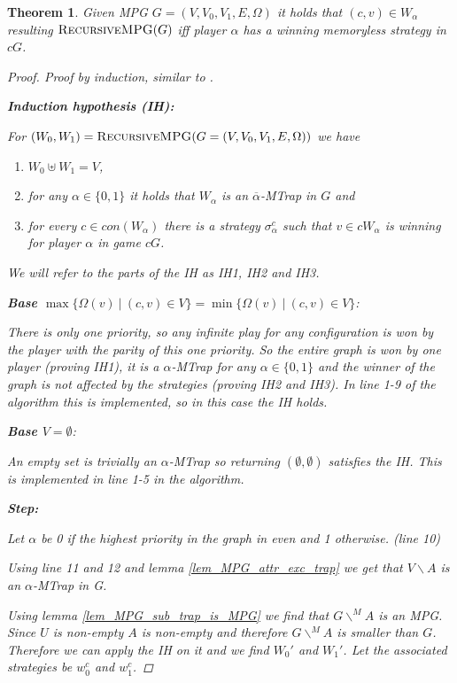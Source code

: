 \documentclass[]{article}
\newtheorem{theorem}{Theorem}[section]
\begin{document}
\begin{theorem}
	Given MPG $G = (V,V_0,V_1,E,\Omega)$ it holds that $(c,v) \in W_\alpha$ resulting $\textsc{RecursiveMPG}(G)$ iff player $\alpha$ has a winning memoryless strategy in $cG$.
	\begin{proof}
		Proof by induction, similar to \cite{ZIELONKA1998135}.
		
		\textbf{Induction hypothesis (IH):}
		
		For $(W_0,W_1) = \textsc{RecursiveMPG}(G = (V,V_0,V_1,E,\Omega))$ we have 
		\begin{enumerate}
			\item $W_0 \uplus W_1 = V$,
			\item for any $\alpha \in \{0,1\}$ it holds that $W_\alpha$ is an $\overline{\alpha}$-MTrap in $G$ and
			\item for every $c\in con(W_\alpha)$ there is a strategy $\sigma_\alpha^c$ such that $v \in cW_\alpha$ is winning for player $\alpha$ in game $cG$.
		\end{enumerate}
	We will refer to the parts of the IH as IH1, IH2 and IH3.
		
		\textbf{Base $\max\{ \Omega(v)\ |\ (c,v) \in V\} = \min\{ \Omega(v)\ |\ (c,v) \in V\}$}:
		
		There is only one priority, so any infinite play for any configuration is won by the player with the parity of this one priority. So the entire graph is won by one player (proving IH1), it is a $\alpha$-MTrap for any $\alpha \in \{0,1\}$ and the winner of the graph is not affected by the strategies (proving IH2 and IH3). In line 1-9 of the algorithm this is implemented, so in this case the IH holds.
		
		\textbf{Base $V = \emptyset$}:
		
		An empty set is trivially an $\alpha$-MTrap so returning $(\emptyset,\emptyset)$ satisfies the IH. This is implemented in line 1-5 in the algorithm.
		
		\textbf{Step:}
		
		Let $\alpha$ be 0 if the highest priority in the graph in even and 1 otherwise. (line 10)
		
		Using line 11 and 12 and lemma \ref{lem_MPG_attr_exc_trap} we get that $V\backslash A$ is an $\alpha$-MTrap in G.
		
		Using lemma \ref{lem_MPG_sub_trap_is_MPG} we find that $G \backslash^{\!\!M}A$ is an MPG. Since $U$ is non-empty $A$ is non-empty and therefore $G \backslash^{\!\!M}A$ is smaller than $G$. Therefore we can apply the IH on it and we find $W_0'$ and $W_1'$. Let the associated strategies be $w_0^c$ and $w_1^c$.
		

\end{proof}
\end{theorem}
\end{document}
